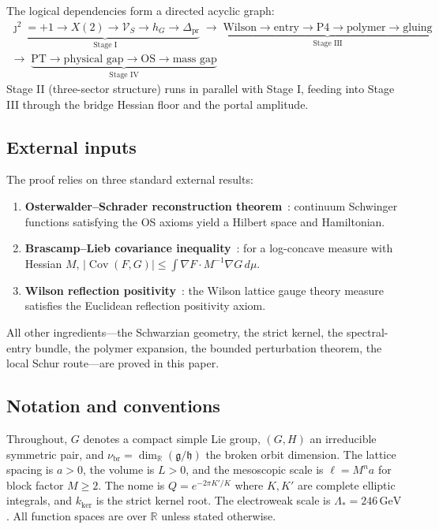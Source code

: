 \documentclass[12pt]{article}
\theoremstyle{plain}
\theoremstyle{definition}
\numberwithin{equation}{section}
\newcommand{\R}{\mathbb{R}}
\newcommand{\fg}{\mathfrak{g}}
\newcommand{\fh}{\mathfrak{h}}
\newcommand{\Cov}{\operatorname{Cov}}
\newcommand{\pr}{\mathrm{pr}}
\newcommand{\br}{\mathrm{br}}
\newcommand{\kker}{\mathrm{ker}}
\begin{document}
The logical dependencies form a directed acyclic graph:
\begin{gather*}
\underbrace{\jmath^2=+1\to X(2)\to\mathcal{V}_S\to h_G\to\Delta_{\pr}}_{\text{Stage I}}
\;\to\;
\underbrace{\text{Wilson}\to\text{entry}\to\text{P4}\to\text{polymer}\to\text{gluing}}_{\text{Stage III}}\\[4pt]
\to\;
\underbrace{\text{PT}\to\text{physical gap}\to\text{OS}\to\text{mass gap}}_{\text{Stage IV}}
\end{gather*}
Stage II (three-sector structure) runs in parallel with Stage I, feeding into Stage III through the bridge Hessian floor and the portal amplitude.

\subsection*{External inputs}

The proof relies on three standard external results:
\begin{enumerate}[label=(\roman*)]
\item \textbf{Osterwalder--Schrader reconstruction theorem}~\cite{OsterwalderSchrader}: continuum Schwinger functions satisfying the OS axioms yield a Hilbert space and Hamiltonian.

\item \textbf{Brascamp--Lieb covariance inequality}~\cite{BrascampLieb}: for a log-concave measure with Hessian $M$, $|\Cov(F,G)|\leq\int\nabla F\cdot M^{-1}\nabla G\,d\mu$.

\item \textbf{Wilson reflection positivity}~\cite{WilsonRP}: the Wilson lattice gauge theory measure satisfies the Euclidean reflection positivity axiom.
\end{enumerate}

All other ingredients---the Schwarzian geometry, the strict kernel, the spectral-entry bundle, the polymer expansion, the bounded perturbation theorem, the local Schur route---are proved in this paper.

\subsection*{Notation and conventions}

Throughout, $G$ denotes a compact simple Lie group, $(G,H)$ an irreducible symmetric pair, and $\nu_{\br}=\dim_\R(\fg/\fh)$ the broken orbit dimension.  The lattice spacing is $a>0$, the volume is $L>0$, and the mesoscopic scale is $\ell=M^n a$ for block factor $M\geq 2$.  The nome is $Q=e^{-2\pi K'/K}$ where $K,K'$ are complete elliptic integrals, and $k_{\kker}$ is the strict kernel root.  The electroweak scale is $\Lambda_*=246\,\mathrm{GeV}$.  All function spaces are over $\R$ unless stated otherwise.
\end{document}
